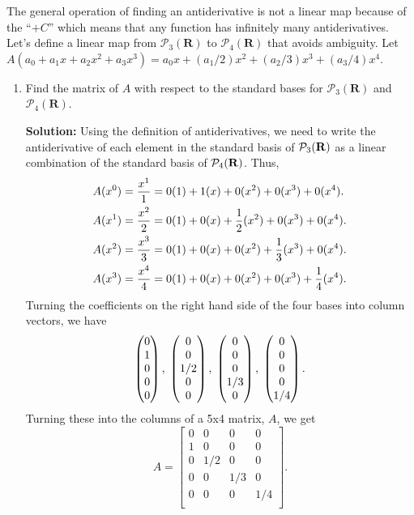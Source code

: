 The general operation of finding an antiderivative is not a linear map because of the ``$+C$'' which means that any function has infinitely many antiderivatives.  Let's define a linear map from $\mathcal{P}_3(\mathbf{R})$ to $\mathcal{P}_4(\mathbf{R})$ that avoids ambiguity.  Let $A(a_0 + a_1x + a_2x^2 + a_3 x^3) = a_0x + (a_1/2)x^2 + (a_2/3)x^3 + (a_3/4) x^4$.
        \begin{enumerate}
        \item Find the matrix of $A$ with respect to the standard bases for $\mathcal{P}_3(\mathbf{R})$ and $\mathcal{P}_4(\mathbf{R})$.\vspace{0.4in}
        \begin{mybox}
        \textbf{Solution: } Using the definition of antiderivatives, we need to write the antiderivative of each element in the standard basis of $\mathcal{P}_{3}(\mathbf{R})$ as a linear combination of the standard basis of $\mathcal{P}_{4}(\mathbf{R})$. Thus,
        \begin{align}
            A(x^0) &= \frac{x^1}{1} = 0(1) + 1(x) + 0(x^2) + 0(x^3) + 0(x^4).\notag\\
            A(x^1) &= \frac{x^2}{2} = 0(1) + 0(x) + \frac{1}{2}(x^2) + 0(x^3) + 0(x^4).\notag\\
            A(x^2) &= \frac{x^3}{3} = 0(1) + 0(x) + 0(x^2) + \frac{1}{3}(x^3) + 0(x^4).\notag\\
            A(x^3) &= \frac{x^4}{4} = 0(1) + 0(x) + 0(x^2) + 0(x^3) + \frac{1}{4}(x^4).\notag
        \end{align}
        Turning the coefficients on the right hand side of the four bases into column vectors, we have
        $$\begin{pmatrix}{0}\\{1}\\{0}\\{0}\\{0}\end{pmatrix},\; \begin{pmatrix}{0}\\{0}\\{1/2}\\{0}\\{0}\end{pmatrix},\; \begin{pmatrix}{0}\\{0}\\{0}\\{1/3}\\{0}\end{pmatrix},\; \begin{pmatrix}{0}\\{0}\\{0}\\{0}\\{1/4}\end{pmatrix}.$$
        Turning these into the columns of a 5x4 matrix, $A$, we get
        $$A = \begin{bmatrix}
            0 & 0 & 0 & 0\\
            1 & 0 & 0 & 0\\
            0 & 1/2 & 0 & 0\\
            0 & 0 & 1/3 & 0\\
            0 & 0 & 0 & 1/4\\
        \end{bmatrix}.
            $$


\end{mybox}
\end{enumerate}
